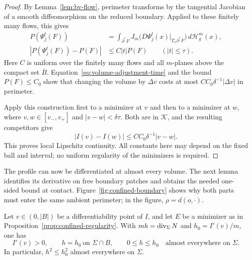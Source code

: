 \begin{proof}
By Lemma~\ref{lem:bv-flow}, perimeter transforms by the tangential
Jacobian of a smooth diffeomorphism on the reduced boundary.  Applied to these finitely many
flows, this gives
\begin{align*}
 P(\Psi_j^t(F))
 &=\int_{\partial^*F}
 J_m\bigl(D\Psi_j^t(x)|_{T_x\partial^*F}\bigr)
 \,d\mathcal H_g^m(x),\\
 |P(\Psi_j^t(F))-P(F)|&\le C|t|P(F)
 \qquad (|t|\le\tau).
\end{align*}
Here $C$ is uniform over the finitely many flows and all $m$-planes
above the compact set $\overline B$.
Equation~\eqref{eq:volume-adjustment-time} and the bound
$P(F)\le C_0$ show that changing the volume by $\Delta v$ costs at
most $C C_0\delta^{-1}|\Delta v|$ in perimeter.

Apply this construction first to a minimizer at $v$ and then to a
minimizer at $w$, where $v,w\in[v_-,v_+]$ and $|v-w|<\delta\tau$.
Both are in $\mathcal K$, and the resulting competitors give
\[
 |I(v)-I(w)|\le C C_0\delta^{-1}|v-w|.
\]
This proves local Lipschitz continuity.  All constants here may depend
on the fixed ball and interval; no uniform regularity of the
minimizers is required.
\end{proof}

The profile can now be differentiated at almost every volume. The next
lemma identifies its derivative on free boundary patches and obtains the
needed one-sided bound at contact. Figure~\ref{fig:confined-boundary}
shows why both parts must enter the same ambient perimeter; in the
figure, $\rho=d(o,\cdot)$.



\begin{lemma}
 \label{lem:profile-curvature}
Let $v\in(0,|B|)$ be a differentiability point of $I$, and let $E$ be
a minimizer as in Proposition~\ref{prop:confined-regularity}.  With
$mh=\operatorname{div}_\Sigma N$ and $h_0=I'(v)/m$, one has
\[
 I'(v)>0,\qquad h=h_0\ \text{on }\Sigma\cap B,
 \qquad 0\le h\le h_0\quad\text{almost everywhere on }\Sigma.
\]
In particular, $h^2\le h_0^2$ almost everywhere on $\Sigma$.
\end{lemma}

